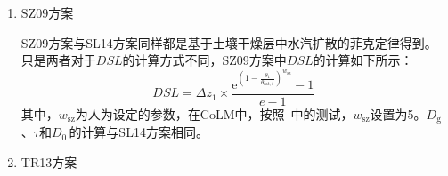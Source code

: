 \begin{enumerate}
  \item
    SZ09方案

    SZ09方案与SL14方案同样都是基于土壤干燥层中水汽扩散的菲克定律得到。只是两者对于\(DSL\)的计算方式不同，SZ09方案中\(DSL\)的计算如下所示：
    \begin{equation}
      DSL = \Delta z_{1} \times \frac{{\mathrm e}^{\left( 1 - \frac{\theta_{1}}{\theta_{\mathrm{sat,1}}} \right)^{w_{\mathrm{sz}}}} - 1}{e - 1}\
    \end{equation}
    其中，\(w_{\mathrm{sz}}\)为人为设定的参数，在CoLM中，按照~\citet{sz2009}中的测试，\(w_{\mathrm{sz}}\)设置为5。\(D_{\mathrm{g}}\)、\(\tau\)和\(D_{0\ }\)的计算与SL14方案相同。

  \item
    TR13方案


\end{enumerate}
